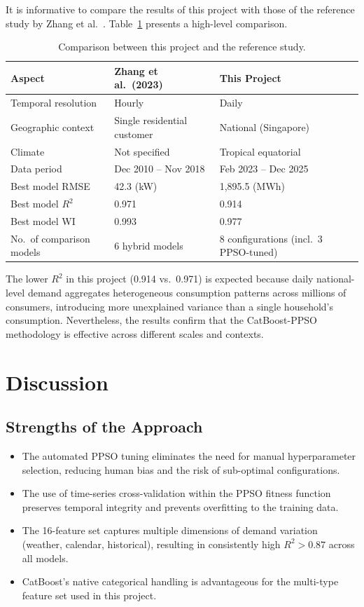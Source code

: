 It is informative to compare the results of this project with those of the reference study by Zhang et al.\ \parencite{zhang2023catboostppso}. Table~\ref{tab:comparison_ref} presents a high-level comparison.

\begin{table}[H]
\centering
\caption{Comparison between this project and the reference study.}
\label{tab:comparison_ref}
\small
\begin{tabular}{@{}lll@{}}
\toprule
\textbf{Aspect} & \textbf{Zhang et al.\ (2023)} & \textbf{This Project} \\
\midrule
Temporal resolution & Hourly & Daily \\
Geographic context & Single residential customer & National (Singapore) \\
Climate & Not specified & Tropical equatorial \\
Data period & Dec 2010 -- Nov 2018 & Feb 2023 -- Dec 2025 \\
Best model RMSE & 42.3 (kW) & 1{,}895.5 (MWh) \\
Best model $R^2$ & 0.971 & 0.914 \\
Best model WI & 0.993 & 0.977 \\
No.\ of comparison models & 6 hybrid models & 8 configurations (incl.\ 3 PPSO-tuned) \\
\bottomrule
\end{tabular}
\end{table}

The lower $R^2$ in this project (0.914 vs.\ 0.971) is expected because daily national-level demand aggregates heterogeneous consumption patterns across millions of consumers, introducing more unexplained variance than a single household's consumption. Nevertheless, the results confirm that the CatBoost-PPSO methodology is effective across different scales and contexts.


\section{Discussion}\label{sec:discussion}

\subsection{Strengths of the Approach}

\begin{itemize}
    \item The automated PPSO tuning eliminates the need for manual hyperparameter selection, reducing human bias and the risk of sub-optimal configurations.
    \item The use of time-series cross-validation within the PPSO fitness function preserves temporal integrity and prevents overfitting to the training data.
    \item The 16-feature set captures multiple dimensions of demand variation (weather, calendar, historical), resulting in consistently high $R^2 > 0.87$ across all models.
    \item CatBoost's native categorical handling is advantageous for the multi-type feature set used in this project.
\end{itemize}

